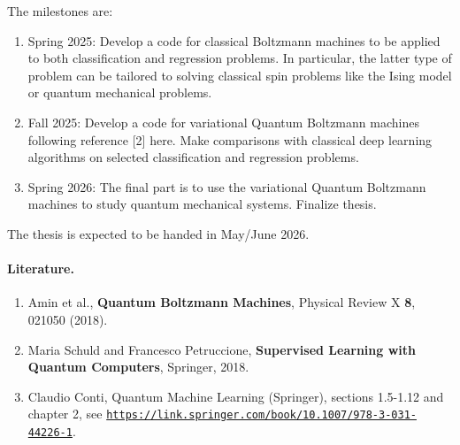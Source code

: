 \documentclass[%
oneside,                 %
final,                   %
10pt]{article}
\begin{document}
\noindent
The milestones are:
\begin{enumerate}
\item Spring 2025: Develop a code for classical Boltzmann machines to be applied to both classification and regression problems. In particular, the latter type of problem can be tailored to solving classical spin problems like the Ising model or quantum mechanical problems. 

\item Fall 2025: Develop a code for variational Quantum Boltzmann machines following reference [2] here.  Make comparisons with classical deep learning algorithms on selected classification and regression problems.

\item Spring 2026: The final part is to use the variational Quantum Boltzmann machines to study quantum mechanical systems. Finalize thesis. 
\end{enumerate}

\noindent
The thesis is expected to be handed in May/June 2026.

\paragraph{Literature.}
\begin{enumerate}
\item Amin et al., \textbf{Quantum Boltzmann Machines}, Physical Review X \textbf{8}, 021050 (2018).

\item Maria Schuld and Francesco Petruccione, \textbf{Supervised Learning with Quantum Computers}, Springer, 2018.

\item Claudio Conti, Quantum Machine Learning (Springer), sections 1.5-1.12 and chapter 2, see \href{{https://link.springer.com/book/10.1007/978-3-031-44226-1}}{\nolinkurl{https://link.springer.com/book/10.1007/978-3-031-44226-1}}.
\end{enumerate}

\noindent


\end{document}

